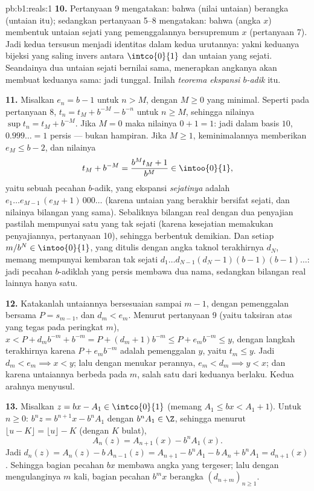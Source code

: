 \begin{solution}{pb:b1:reals:1}
\textbf{10.} Pertanyaan 9 mengatakan: bahwa (nilai untaian) berangka (untaian
itu); sedangkan pertanyaan 5--8 mengatakan: bahwa (angka $x$) membentuk untaian sejati
yang pemenggalannya bersupremum $x$ (pertanyaan 7). Jadi kedua 
tersusun menjadi identitas dalam kedua urutannya: yakni keduanya bijeksi
yang saling invers antara $\intco{0}{1}$ dan untaian yang sejati. Seandainya dua
untaian sejati bernilai sama, menerapkan  angkanya akan membuat
keduanya sama: jadi tunggal. Inilah \emph{teorema ekspansi
$b$-adik} itu.

\textbf{11.} Misalkan $e_n = b - 1$ untuk $n > M$, dengan $M \geq 0$ yang minimal.
Seperti pada pertanyaan 8, $t_n = t_M + b^{-M} - b^{-n}$ untuk $n \geq M$,
sehingga nilainya $\sup t_n = t_M + b^{-M}$. Jika $M = 0$ maka nilainya
$0 + 1 = 1$: jadi dalam basis $10$, $0.999\dots = 1$ persis --- bukan
hampiran. Jika $M \geq 1$, keminimalannya memberikan $e_M \leq b - 2$,
dan nilainya
\[
t_M + b^{-M} = \frac{b^M t_M + 1}{b^M} \in \intoo{0}{1},
\]
yaitu sebuah pecahan $b$-adik, yang ekspansi \emph{sejatinya} adalah $e_1 \dots
e_{M-1}\,(e_M + 1)\,000\dots$ (karena untaian yang berakhir bersifat sejati,
dan nilainya bilangan yang sama). Sebaliknya bilangan real dengan dua
penyajian pastilah mempunyai satu yang tak sejati (karena kesejatian memakukan
penyajiannya, pertanyaan 10), sehingga berbentuk demikian. Dan setiap
$m/b^N \in \intoo{0}{1}$, yang ditulis dengan angka taknol terakhirnya $d_N$,
memang mempunyai kembaran tak sejati $d_1 \dots d_{N-1}(d_N -
1)(b-1)(b-1)\dots$: jadi pecahan $b$-adiklah yang persis membawa dua
nama, sedangkan bilangan real lainnya hanya satu.

\textbf{12.} Katakanlah untaiannya bersesuaian sampai $m - 1$, dengan pemenggalan
bersama $P = s_{m-1}$, dan $d_m < e_m$. Menurut pertanyaan 9 (yaitu taksiran
atas yang tegas pada peringkat $m$), $x < P + d_m b^{-m} + b^{-m} = P +
(d_m + 1)b^{-m} \leq P + e_m b^{-m} \leq y$, dengan langkah terakhirnya
karena $P + e_m b^{-m}$ adalah pemenggalan $y$, yaitu $t_m \leq y$. Jadi
$d_m < e_m \implies x < y$; lalu dengan menukar perannya, $e_m < d_m \implies
y < x$; dan karena untaiannya berbeda pada $m$, salah satu dari keduanya
berlaku. Kedua arahnya menyusul.

\textbf{13.} Misalkan $z = bx - A_1 \in \intco{0}{1}$ (memang $A_1
\leq bx < A_1 + 1$). Untuk $n \geq 0$: $b^n z = b^{n+1} x - b^n
A_1$ dengan $b^n A_1 \in \Z$, sehingga menurut $\lfloor u - K \rfloor =
\lfloor u \rfloor - K$ (dengan $K$ bulat),
\[
A_n(z) = A_{n+1}(x) - b^n A_1(x) .
\]
Jadi $d_n(z) = A_n(z) - b\,A_{n-1}(z) = A_{n+1} - b^n A_1 -
b\,A_n + b^n A_1 = d_{n+1}(x)$. Sehingga bagian pecahan $bx$
membawa angka yang tergeser; lalu dengan mengulanginya $m$ kali, bagian
pecahan $b^m x$ berangka $(d_{n+m})_{n \geq 1}$.


\end{solution}
